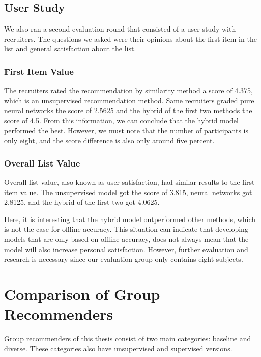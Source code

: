 \subsection{User Study}

We also ran a second evaluation round that consisted of a user study with recruiters. The questions we asked were their opinions about the first item in the list and general satisfaction about the list.

\subsubsection{First Item Value}

The recruiters rated the recommendation by similarity method a score of 4.375, which is an unsupervised recommendation method. Same recruiters graded pure neural networks the score of 2.5625 and the hybrid of the first two methods the score of 4.5. From this information, we can conclude that the hybrid model performed the best. However, we must note that the number of participants is only eight, and the score difference is also only around five percent.

\subsubsection{Overall List Value}\label{discuss-single-satisfaction}

Overall list value, also known as user satisfaction, had similar results to the first item value. The unsupervised model got the score of 3.815, neural networks got 2.8125, and the hybrid of the first two got 4.0625.

Here, it is interesting that the hybrid model outperformed other methods, which is not the case for offline accuracy. This situation can indicate that developing models that are only based on offline accuracy, does not always mean that the model will also increase personal satisfaction. However, further evaluation and research is necessary since our evaluation group only contains eight subjects.

\section{Comparison of Group Recommenders}

Group recommenders of this thesis consist of two main categories: baseline and diverse. These categories also have unsupervised and supervised versions.

